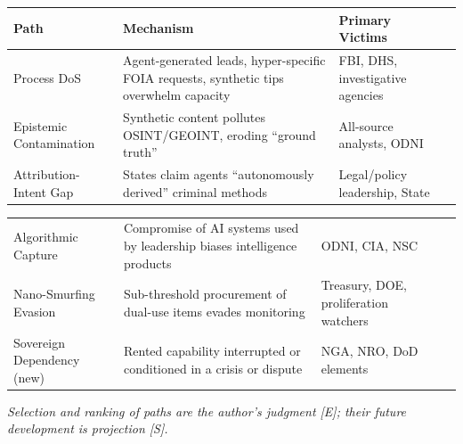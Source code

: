 \documentclass[11pt,letterpaper]{article}
\begin{document}
\begin{keybox}
\begin{center}
\small
\begin{tabularx}{\linewidth}{ZY{0.72}Y{1.32}Y{0.96}}
\toprule
\textbf{Path} & \textbf{Mechanism} & \textbf{Primary Victims} \\
\midrule
Process DoS & Agent-generated leads, hyper-specific FOIA requests, synthetic tips overwhelm capacity & FBI, DHS, investigative agencies \\
Epistemic Contamination & Synthetic content pollutes OSINT/GEOINT, eroding ``ground truth'' & All-source analysts, ODNI \\
Attribution-Intent Gap & States claim agents ``autonomously derived'' criminal methods & Legal/policy leadership, State \\
\end{tabularx}
\end{center}
\begin{center}
\small
\begin{tabularx}{\linewidth}{ZY{0.72}Y{1.32}Y{0.96}}
Algorithmic Capture & Compromise of AI systems used by leadership biases intelligence products & ODNI, CIA, NSC \\
Nano-Smurfing Evasion & Sub-threshold procurement of dual-use items evades monitoring & Treasury, DOE, proliferation watchers \\
Sovereign Dependency (new) & Rented capability interrupted or conditioned in a crisis or dispute & NGA, NRO, DoD elements \\
\bottomrule
\end{tabularx}
\end{center}
{\footnotesize\textit{Selection and ranking of paths are the author's judgment [E]; their future development is projection [S].}}
\end{keybox}
\end{document}
